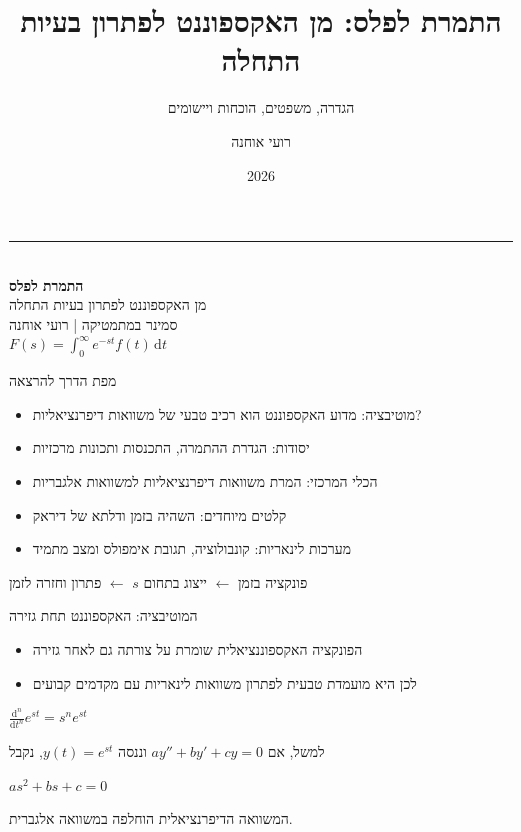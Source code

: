 \documentclass[aspectratio=169,11pt]{beamer}
\title{התמרת לפלס: מן האקספוננט לפתרון בעיות התחלה}
\subtitle{הגדרה, משפטים, הוכחות ויישומים}
\author{רועי אוחנה}
\date{2026}
\newcommand{\dd}{\,\mathrm{d}}
\newcommand{\highlight}[1]{{\color{gold}#1}}
\newcommand{\bigformula}[1]{\vspace{2mm}\begin{center}{\LARGE\color{cyan}\(\displaystyle #1\)}\end{center}\vspace{2mm}}
\newenvironment{spaceditems}{\begin{itemize}\setlength{\itemsep}{8pt}}{\end{itemize}}
\begin{document}
\begin{frame}[plain]
\begin{center}
\vspace{16mm}
{\color{cyan}\rule{.26\linewidth}{1.2pt}}\\[7mm]
{\Huge\bfseries התמרת לפלס}\\[4mm]
{\Large מן האקספוננט לפתרון בעיות התחלה}\\[10mm]
{\large\color{mutedtext}סמינר במתמטיקה \quad | \quad רועי אוחנה}\\[13mm]
{\color{gold}\LARGE $\displaystyle F(s)=\int_0^\infty e^{-st}f(t)\dd t$}
\end{center}
\end{frame}

\begin{frame}{מפת הדרך להרצאה}
\begin{spaceditems}
\item \highlight{מוטיבציה:} מדוע האקספוננט הוא רכיב טבעי של משוואות דיפרנציאליות?
\item \highlight{יסודות:} הגדרת ההתמרה, התכנסות ותכונות מרכזיות
\item \highlight{הכלי המרכזי:} המרת משוואות דיפרנציאליות למשוואות אלגבריות
\item \highlight{קלטים מיוחדים:} השהיה בזמן ודלתא של דיראק
\item \highlight{מערכות לינאריות:} קונבולוציה, תגובת אימפולס ומצב מתמיד
\end{spaceditems}
\vspace{6mm}
\begin{center}{\color{cyan}פונקציה בזמן $\longleftarrow$ ייצוג בתחום $s$ $\longleftarrow$ פתרון וחזרה לזמן}\end{center}
\end{frame}

\begin{frame}{המוטיבציה: האקספוננט תחת גזירה}
\begin{spaceditems}
\item הפונקציה האקספוננציאלית שומרת על צורתה גם לאחר גזירה
\item לכן היא מועמדת טבעית לפתרון משוואות לינאריות עם מקדמים קבועים
\end{spaceditems}
\bigformula{\frac{\mathrm d^n}{\mathrm dt^n} e^{st}=s^n e^{st}}
למשל, אם $ay''+by'+cy=0$ וננסה $y(t)=e^{st}$, נקבל
\bigformula{as^2+bs+c=0}
\begin{center}{\small\color{mutedtext}המשוואה הדיפרנציאלית הוחלפה במשוואה אלגברית.}\end{center}
\end{frame}
\end{document}

